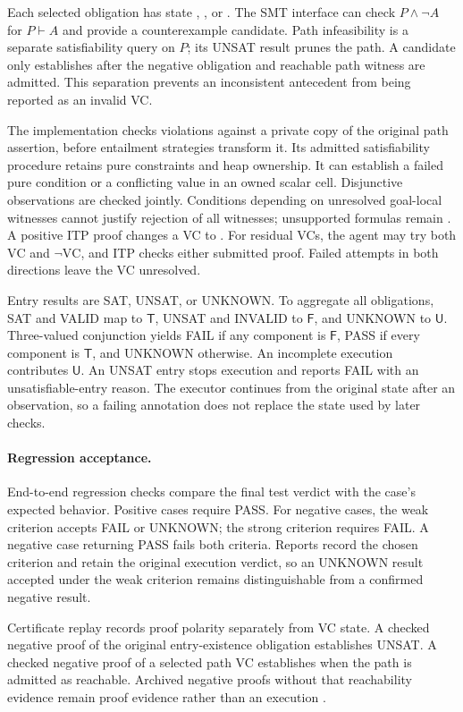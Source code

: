 Each selected obligation has state \valid{}, \invalid{}, or \unknown{}.
The SMT interface can check $P\land\neg A$ for $P\vdash A$ and provide a
counterexample candidate. Path infeasibility is a separate satisfiability
query on $P$; its UNSAT result prunes the path. A candidate only establishes
\invalid{} after the negative obligation and reachable path witness are
admitted. This separation prevents an inconsistent antecedent from being
reported as an invalid VC.

The implementation checks violations against a private copy of the original
path assertion, before entailment strategies transform it. Its admitted
satisfiability procedure retains pure constraints and heap ownership. It can
establish a failed pure condition or a conflicting value in an owned scalar
cell. Disjunctive observations are checked jointly. Conditions depending on
unresolved goal-local witnesses cannot justify rejection of all witnesses;
unsupported formulas remain \unknown{}. A positive ITP proof changes a VC to
\valid{}. For residual VCs, the agent may try both $\mathrm{VC}$ and
$\neg\mathrm{VC}$, and ITP checks either submitted proof. Failed attempts in
both directions leave the VC unresolved.

Entry results are SAT, UNSAT, or UNKNOWN. To aggregate all obligations,
SAT and VALID map to $\mathsf T$, UNSAT and INVALID to $\mathsf F$, and UNKNOWN
to $\mathsf U$. Three-valued conjunction yields FAIL if any component is
$\mathsf F$, PASS if every component is $\mathsf T$, and UNKNOWN otherwise.
An incomplete execution contributes $\mathsf U$. An UNSAT entry stops execution
and reports FAIL with an unsatisfiable-entry reason. The executor continues
from the original state after an observation, so a failing annotation does
not replace the state used by later checks.

\paragraph{Regression acceptance.}
End-to-end regression checks compare the final test verdict with the case's
expected behavior. Positive cases require PASS. For negative cases, the weak
criterion accepts FAIL or UNKNOWN; the strong criterion requires FAIL.
A negative case returning PASS fails both criteria. Reports record the chosen
criterion and retain the original execution verdict, so an UNKNOWN result
accepted under the weak criterion remains distinguishable from a confirmed
negative result.

Certificate replay records proof polarity separately from VC state. A checked
negative proof of the original entry-existence obligation establishes UNSAT.
A checked negative proof of a selected path VC establishes \invalid{} when
the path is admitted as reachable. Archived negative proofs without that
reachability evidence remain proof evidence rather than an execution \fail{}.

